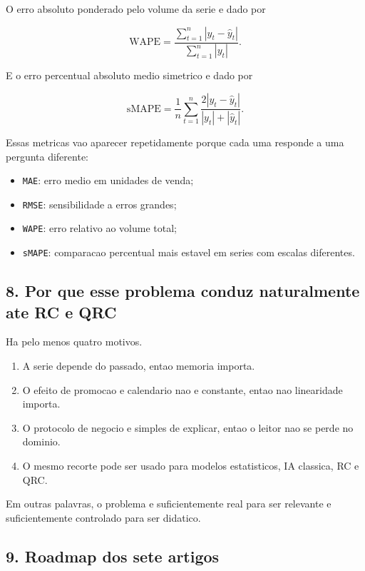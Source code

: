 \documentclass[12pt]{article}
\providecommand{\tightlist}{%
          \setlength{\itemsep}{0pt}\setlength{\parskip}{0pt}}
\begin{document}
O erro absoluto ponderado pelo volume da serie e dado por

\[
\mathrm{WAPE} = \frac{\sum_{t=1}^n |y_t - \hat{y}_t|}{\sum_{t=1}^n |y_t|}.
\]

E o erro percentual absoluto medio simetrico e dado por

\[
\mathrm{sMAPE} = \frac{1}{n} \sum_{t=1}^n
\frac{2 |y_t - \hat{y}_t|}{|y_t| + |\hat{y}_t|}.
\]

Essas metricas vao aparecer repetidamente porque cada uma responde a uma pergunta diferente:

\begin{itemize}
\tightlist
\item
  \texttt{MAE}: erro medio em unidades de venda;
\item
  \texttt{RMSE}: sensibilidade a erros grandes;
\item
  \texttt{WAPE}: erro relativo ao volume total;
\item
  \texttt{sMAPE}: comparacao percentual mais estavel em series com escalas diferentes.
\end{itemize}

\subsection{8. Por que esse problema conduz naturalmente ate RC e QRC}\label{8-por-que-esse-problema-conduz-naturalmente-ate-rc-e-qrc}

Ha pelo menos quatro motivos.

\begin{enumerate}
\def\labelenumi{\arabic{enumi}.}
\tightlist
\item
  A serie depende do passado, entao memoria importa.
\item
  O efeito de promocao e calendario nao e constante, entao nao linearidade importa.
\item
  O protocolo de negocio e simples de explicar, entao o leitor nao se perde no dominio.
\item
  O mesmo recorte pode ser usado para modelos estatisticos, IA classica, RC e QRC.
\end{enumerate}

Em outras palavras, o problema e suficientemente real para ser relevante e suficientemente controlado para ser didatico.

\subsection{9. Roadmap dos sete artigos}\label{9-roadmap-dos-sete-artigos}
\end{document}

